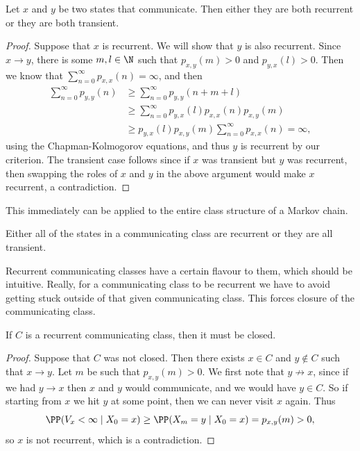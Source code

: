 \documentclass[a4paper]{scrartcl}
\begin{document}
\begin{theorem}
	Let $x$ and $y$ be two states that communicate. Then either they are both recurrent or they are both transient.
\end{theorem}
\begin{proof}
	Suppose that $x$ is recurrent. We will show that $y$ is also recurrent. Since $x \rightarrow y$, there is some $m, l \in \N$ such that $p_{x, y}(m) > 0$ and $p_{y, x}(l) > 0$. Then we know that $\sum_{n = 0}^{\infty} p_{x, x}(n) = \infty$, and then
	\begin{align*}
	\sum_{n = 0}^{\infty} p_{y, y}(n) 
	&\geq \sum_{n = 0}^{\infty} 
	p_{y, y}(n + m + l) \\ 
	&\geq \sum_{n = 0}^{\infty} p_{y, x}(l) p_{x, x}(n) p_{x, y}(m)  \\
	&\geq p_{y, x}(l) p_{x, y}(m) \sum_{n = 0}^{\infty} p_{x, x}(n) = \infty,
	\end{align*}
	using the Chapman-Kolmogorov equations, and thus $y$ is recurrent by our criterion. The transient case follows since if $x$ was transient but $y$ was recurrent, then swapping the roles of $x$ and $y$ in the above argument would make $x$ recurrent, a contradiction.
\end{proof}

This immediately can be applied to the entire class structure of a Markov chain.

\begin{corollary}
	Either all of the states in a communicating class are recurrent or they are all transient.
\end{corollary}

Recurrent communicating classes have a certain flavour to them, which should be intuitive. Really, for a communicating class to be recurrent we have to avoid getting stuck outside of that given communicating class. This forces closure of the communicating class.

\begin{theorem}
	If $C$ is a recurrent communicating class, then it must be closed.
\end{theorem}
\begin{proof}
	Suppose that $C$ was not closed. Then there exists $x \in C$ and $y \not \in C$ such that $x \rightarrow y$. Let $m$ be such that $p_{x, y}(m) > 0$. We first note that $y \not \rightarrow x$, since if we had $y \rightarrow x$ then $x$ and $y$ would communicate, and we would have $y \in C$. So if starting from $x$ we hit $y$ at some point, then we can never visit $x$ again. Thus
	$$
	\PP(V_x < \infty \mid X_0 = x) \geq \PP(X_m = y \mid X_0 = x) = p_{x, y}(m) > 0,
	$$
	so $x$ is not recurrent, which is a contradiction.
\end{proof}
\end{document}
